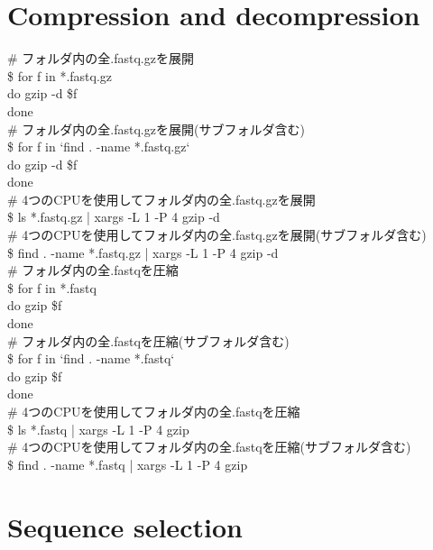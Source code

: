 \documentclass[titlepage,10pt,a4paper,english]{jsbook}
\newenvironment{cmd}{\begin{oframed}\raggedright\ttfamily\footnotesize\setlength{\baselineskip}{1.4em}}{\end{oframed}\vspace{-1em}}
\begin{document}
\section{Compression and decompression}

\begin{cmd}
\# フォルダ内の全.fastq.gzを展開\\
\$ for f in *.fastq.gz\\
do gzip -d \$f\\
done\\
\# フォルダ内の全.fastq.gzを展開(サブフォルダ含む)\\
\$ for f in `find . -name *.fastq.gz`\\
do gzip -d \$f\\
done\\
\# 4つのCPUを使用してフォルダ内の全.fastq.gzを展開\\
\$ ls *.fastq.gz | xargs -L 1 -P 4 gzip -d\\
\# 4つのCPUを使用してフォルダ内の全.fastq.gzを展開(サブフォルダ含む)\\
\$ find . -name *.fastq.gz | xargs -L 1 -P 4 gzip -d\\
\# フォルダ内の全.fastqを圧縮\\
\$ for f in *.fastq\\
do gzip \$f\\
done\\
\# フォルダ内の全.fastqを圧縮(サブフォルダ含む)\\
\$ for f in `find . -name *.fastq`\\
do gzip \$f\\
done\\
\# 4つのCPUを使用してフォルダ内の全.fastqを圧縮\\
\$ ls *.fastq | xargs -L 1 -P 4 gzip\\
\# 4つのCPUを使用してフォルダ内の全.fastqを圧縮(サブフォルダ含む)\\
\$ find . -name *.fastq | xargs -L 1 -P 4 gzip
\end{cmd}

\section{Sequence selection}
\end{document}
